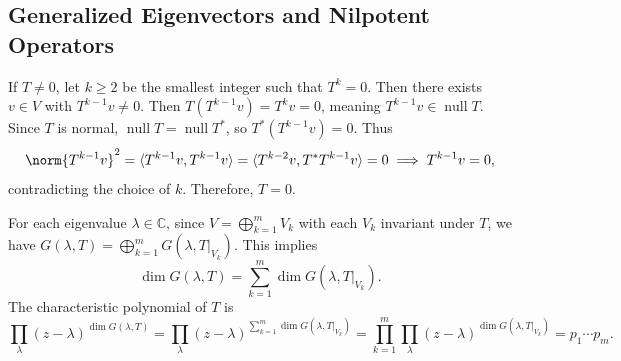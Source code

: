 \subsection{Generalized Eigenvectors and Nilpotent Operators}


\begin{csp}
    If $T \neq 0$, let $k \geq 2$ be the smallest integer such that $T^k=0$. Then there exists $v \in V$ with $T^{k-1} v \neq 0$. Then $T(T^{k-1}v)=T^k v=0$, meaning $T^{k-1} v \in \operatorname{null} T$. Since $T$ is normal, $\operatorname{null} T=\operatorname{null} T^{\ast}$, so $T^{\ast}(T^{k-1}v)=0$. Thus
    $$\norm{T^{k-1}v}^2=\langle T^{k-1}v, T^{k-1}v \rangle=\langle T^{k-2}v, T^{\ast}T^{k-1}v \rangle=0 \implies T^{k-1}v=0,$$
    contradicting the choice of $k$. Therefore, $T=0$.
\end{csp}


\begin{csp}
    For each eigenvalue $\lambda \in \mathbb{C}$, since $V=\bigoplus \limits^{m}_{k=1} V_k$ with each $V_k$ invariant under $T$, we have $G(\lambda,T)=\bigoplus \limits^{m}_{k=1} G\left(\lambda, T \vert_{V_k} \right)$. This implies 
    $$\dim G(\lambda,T)=\sum^{m}_{k=1} \dim G\left(\lambda, T \vert_{V_k} \right).$$
    The characteristic polynomial of $T$ is
    $$\prod_{\lambda} (z-\lambda)^{\dim G(\lambda,T)}=\prod_{\lambda} (z-\lambda)^{\sum \limits^{m}_{k=1} \dim G\left(\lambda, T \vert_{V_k} \right)}=\prod^{m}_{k=1} \prod_{\lambda} (z-\lambda)^{\dim G\left(\lambda, T \vert_{V_k} \right)}=p_1 \cdots p_m.$$
\end{csp}